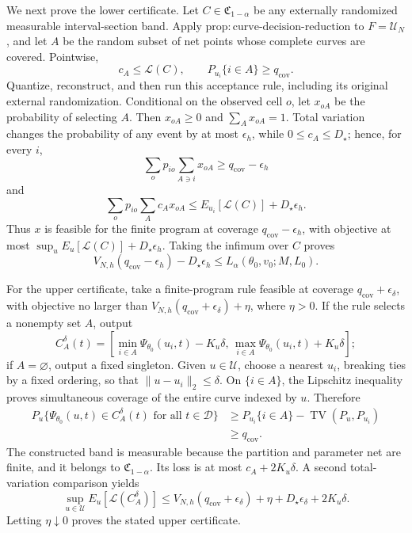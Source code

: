 We next prove the lower certificate.  Let \(C\in\mathfrak C_{1-\alpha}\) be any externally randomized measurable interval-section band.  Apply \(\mathrm{prop:curve\mbox{-}decision\mbox{-}reduction}\) to \(F=\mathcal U_N\), and let \(A\) be the random subset of net points whose complete curves are covered.  Pointwise,
\[
c_A\le\mathcal L(C),
\qquad
P_{u_i}\{i\in A\}\ge q_{\mathrm{cov}}.
\]
Quantize, reconstruct, and then run this acceptance rule, including its original external randomization.  Conditional on the observed cell \(o\), let \(x_{oA}\) be the probability of selecting \(A\).  Then \(x_{oA}\ge0\) and \(\sum_Ax_{oA}=1\).  Total variation changes the probability of any event by at most \(\epsilon_h\), while \(0\le c_A\le D_\star\); hence, for every \(i\),
\[
\sum_op_{io}\sum_{A\ni i}x_{oA}
\ge q_{\mathrm{cov}}-\epsilon_h
\]
and
\[
\sum_op_{io}\sum_Ac_Ax_{oA}
\le E_{u_i}[\mathcal L(C)]+D_\star\epsilon_h.
\]
Thus \(x\) is feasible for the finite program at coverage \(q_{\mathrm{cov}}-\epsilon_h\), with objective at most
\(\sup_uE_u[\mathcal L(C)]+D_\star\epsilon_h\).  Taking the infimum over \(C\) proves
\[
V_{N,h}(q_{\mathrm{cov}}-\epsilon_h)-D_\star\epsilon_h
\le L_\alpha(\theta_0,v_0;M,L_0).
\]

For the upper certificate, take a finite-program rule feasible at coverage \(q_{\mathrm{cov}}+\epsilon_\delta\), with objective no larger than
\(V_{N,h}(q_{\mathrm{cov}}+\epsilon_\delta)+\eta\), where \(\eta>0\).  If the rule selects a nonempty set \(A\), output
\[
C_A^\delta(t)=
\left[
\min_{i\in A}\Psi_{\theta_0}(u_i,t)-K_u\delta,\,
\max_{i\in A}\Psi_{\theta_0}(u_i,t)+K_u\delta
\right];
\]
if \(A=\varnothing\), output a fixed singleton.  Given \(u\in\mathcal U\), choose a nearest \(u_i\), breaking ties by a fixed ordering, so that \(\lVert u-u_i\rVert_2\le\delta\).  On \(\{i\in A\}\), the Lipschitz inequality proves simultaneous coverage of the entire curve indexed by \(u\).  Therefore
\[
\begin{aligned}
P_u\{\Psi_{\theta_0}(u,t)\in C_A^\delta(t)
\text{ for all }t\in\mathcal D\}
&\ge P_{u_i}\{i\in A\}
-\operatorname{TV}(P_u,P_{u_i})\\
&\ge q_{\mathrm{cov}}.
\end{aligned}
\]
The constructed band is measurable because the partition and parameter net are finite, and it belongs to \(\mathfrak C_{1-\alpha}\).  Its loss is at most \(c_A+2K_u\delta\).  A second total-variation comparison yields
\[
\sup_{u\in\mathcal U}E_u[\mathcal L(C_A^\delta)]
\le
V_{N,h}(q_{\mathrm{cov}}+\epsilon_\delta)
+\eta+D_\star\epsilon_\delta+2K_u\delta.
\]
Letting \(\eta\downarrow0\) proves the stated upper certificate.

